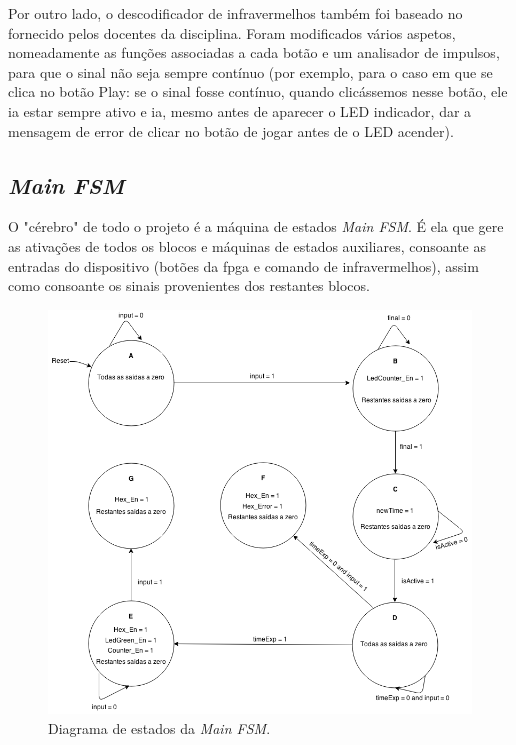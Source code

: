 \documentclass[a4paper,11pt,onecolumn]{report}
\begin{document}
Por outro lado, o descodificador de infravermelhos também foi baseado no fornecido pelos docentes da disciplina. Foram modificados vários aspetos, nomeadamente as funções associadas a cada botão e um analisador de impulsos, para que o sinal não seja sempre contínuo (por exemplo, para o caso em que se clica no botão Play: se o sinal fosse contínuo, quando clicássemos nesse botão, ele ia estar sempre ativo e ia, mesmo antes de aparecer o LED indicador, dar a mensagem de error de clicar no botão de jogar antes de o LED acender).

\subsection{\textit{Main FSM}}

O "cérebro" de todo o projeto é a máquina de estados \textit{Main FSM}. É ela que gere as ativações de todos os blocos e máquinas de estados auxiliares, consoante as entradas do dispositivo (botões da \ac{fpga} e comando de infravermelhos), assim como consoante os sinais provenientes dos restantes blocos.

\begin{figure}[h]
\centerline{\includegraphics[scale=0.4]{Images/MainFSMDiagram}}
\caption{Diagrama de estados da \textit{Main FSM}.}
\label{figmainfsm}
\end{figure}
\end{document}
